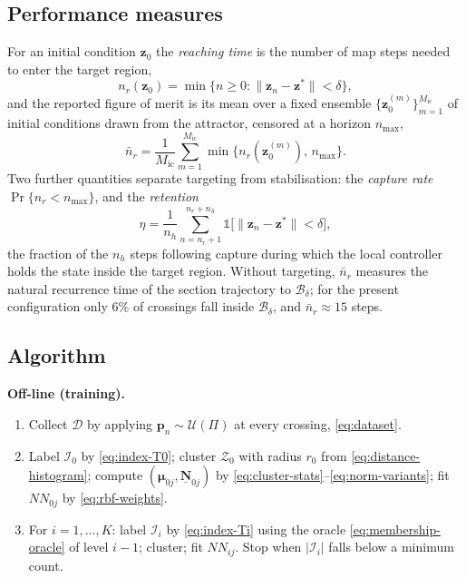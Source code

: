 \subsection{Performance measures}
\label{subsec:ecr-metrics}

For an initial condition $\mathbf{z}_0$ the \emph{reaching time} is the number
of map steps needed to enter the target region,
%
\begin{equation}
n_r(\mathbf{z}_0)=\min\bigl\{n\ge0:\|\mathbf{z}_n-\mathbf{z}^{*}\|<\delta\bigr\},
\label{eq:reaching-time}
\end{equation}
%
and the reported figure of merit is its mean over a fixed ensemble
$\{\mathbf{z}_0^{(m)}\}_{m=1}^{M_{\mathrm{ic}}}$ of initial conditions drawn
from the attractor, censored at a horizon $n_{\max}$,
%
\begin{equation}
\bar{n}_r=\frac{1}{M_{\mathrm{ic}}}\sum_{m=1}^{M_{\mathrm{ic}}}
\min\bigl\{n_r(\mathbf{z}_0^{(m)}),\,n_{\max}\bigr\} .
\label{eq:mean-reaching-time}
\end{equation}
%
Two further quantities separate targeting from stabilisation: the
\emph{capture rate} $\Pr\{n_r<n_{\max}\}$, and the \emph{retention}
%
\begin{equation}
\eta=\frac{1}{n_h}\sum_{n=n_r+1}^{n_r+n_h}\mathbb{1}\bigl[\|\mathbf{z}_n-\mathbf{z}^{*}\|<\delta\bigr],
\label{eq:retention}
\end{equation}
%
the fraction of the $n_h$ steps following capture during which the local
controller holds the state inside the target region. Without targeting,
$\bar{n}_r$ measures the natural recurrence time of the section trajectory to
$\mathcal{B}_\delta$; for the present configuration only $6\%$ of crossings
fall inside $\mathcal{B}_\delta$, and $\bar{n}_r\approx15$ steps.

\subsection{Algorithm}
\label{subsec:ecr-algorithm}

\noindent\textbf{Off-line (training).}
\begin{enumerate}
\item Collect $\mathcal{D}$ by applying $\mathbf{p}_n\sim\mathcal{U}(\Pi)$ at
every crossing, \eqref{eq:dataset}.
\item Label $\mathcal{I}_0$ by \eqref{eq:index-T0}; cluster $\mathcal{Z}_0$
with radius $r_0$ from \eqref{eq:distance-histogram}; compute
$(\bm{\mu}_{0j},\underline{\mathbf{N}}_{0j})$ by
\eqref{eq:cluster-stats}--\eqref{eq:norm-variants}; fit $NN_{0j}$ by
\eqref{eq:rbf-weights}.
\item For $i=1,\dots,K$: label $\mathcal{I}_i$ by \eqref{eq:index-Ti} using the
oracle \eqref{eq:membership-oracle} of level $i-1$; cluster; fit $NN_{ij}$.
Stop when $|\mathcal{I}_i|$ falls below a minimum count.
\end{enumerate}

